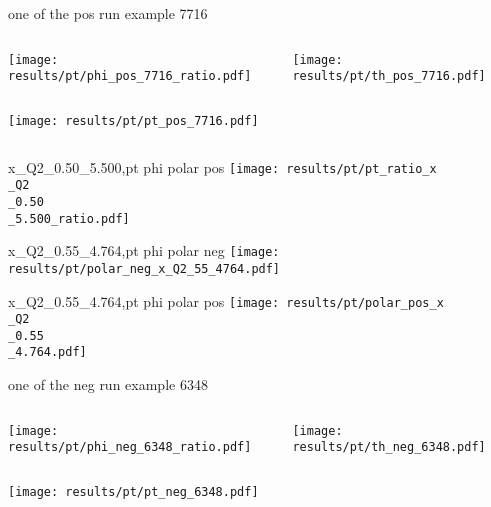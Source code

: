 \begin{frame}{one of the pos run example 7716}
\begin{columns}
\begin{column}[T]{0.5\textwidth}
\texttt{[image: results/pt/phi\_pos\_7716\_ratio.pdf]}
\end{column}
\begin{column}[T]{0.5\textwidth}
\texttt{[image: results/pt/th\_pos\_7716.pdf]}
\end{column}
\end{columns}
\begin{columns}
\begin{column}[T]{0.5\textwidth}
\texttt{[image: results/pt/pt\_pos\_7716.pdf]}
\end{column}
\begin{column}[T]{0.5\textwidth}
\end{column}
\end{columns}
\end{frame}
\begin{frame}{x\_Q2\_0.50\_5.500,pt phi polar pos}
\texttt{[image: results/pt/pt\_ratio\_x\\\_Q2\\\_0.50\\\_5.500\_ratio.pdf]}
\end{frame}
\begin{frame}{x\_Q2\_0.55\_4.764,pt phi polar neg}
\texttt{[image: results/pt/polar\_neg\_x\_Q2\_55\_4764.pdf]}
\end{frame}
\begin{frame}{x\_Q2\_0.55\_4.764,pt phi polar pos}
\texttt{[image: results/pt/polar\_pos\_x\\\_Q2\\\_0.55\\\_4.764.pdf]}
\end{frame}
\begin{frame}{one of the neg run example 6348}
\begin{columns}
\begin{column}[T]{0.5\textwidth}
\texttt{[image: results/pt/phi\_neg\_6348\_ratio.pdf]}
\end{column}
\begin{column}[T]{0.5\textwidth}
\texttt{[image: results/pt/th\_neg\_6348.pdf]}
\end{column}
\end{columns}
\texttt{[image: results/pt/pt\_neg\_6348.pdf]}
\end{frame}
